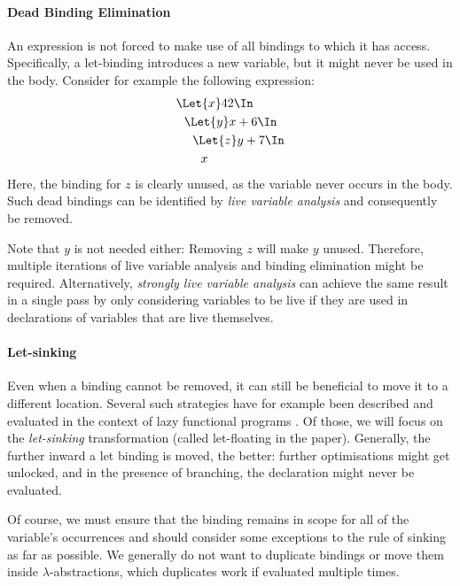   \paragraph{Dead Binding Elimination}
    An expression is not forced to make use of all bindings to which it has access.
    Specifically, a let-binding introduces a new variable, but it might never be used
    in the body.
    Consider for example the following expression:
    \begin{align*}
      &\Let{x} 42 \In            \\
      &\ \ \Let{y} x + 6 \In     \\
      &\ \ \ \ \Let{z} y + 7 \In \\
      &\ \ \ \ \ \ x
    \end{align*}
    Here, the binding for $z$ is clearly unused, as the variable never occurs in the body.
    Such dead bindings can be identified by \emph{live variable analysis}
    and consequently be removed.

    Note that $y$ is not needed either: Removing $z$ will make $y$ unused.
    Therefore, multiple iterations of live variable analysis and binding elimination might be required.
    Alternatively, \emph{strongly live variable analysis} can achieve the same result in a single pass
    by only considering variables to be live
    if they are used in declarations of variables that are live themselves.

  \paragraph{Let-sinking}
    Even when a binding cannot be removed,
    it can still be beneficial to move it to a different location.
    Several such strategies have for example been described and evaluated
    in the context of lazy functional programs
    \cite{Jones1996LetFloating}.
    Of those, we will focus on the \emph{let-sinking} transformation
    (called let-floating in the paper).
    Generally, the further inward a let binding is moved, the better:
    further optimisations might get unlocked, and in the presence of branching,
    the declaration might never be evaluated.

    Of course, we must ensure that the binding remains in scope
    for all of the variable's occurrences
    and should consider some exceptions to the rule of sinking as far as possible.
    We generally do not want to duplicate bindings
    or move them inside $\lambda$-abstractions, which duplicates work
    if evaluated multiple times.

